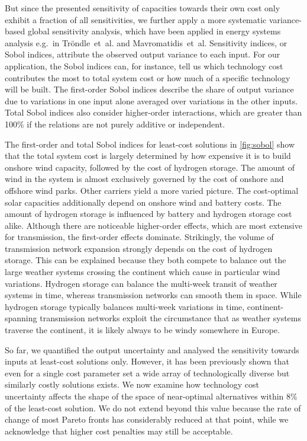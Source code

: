 But since the presented sensitivity of capacities towards their own cost only
exhibit a fraction of all sensitivities, we further apply a more systematic
variance-based global sensitivity analysis, which have been applied in energy
systems analysis e.g.~in Tröndle~et~al.\cite{trondle_trade-offs_2020} and
Mavromatidis~et~al.\cite{mavromatidis_uncertainty_2018} Sensitivity indices, or
Sobol indices, attribute the observed output variance to each input.
\cite{sudret_global_2008} For our application, the Sobol indices can, for
instance, tell us which technology cost contributes the most to total system
cost or how much of a specific technology will be built. The first-order Sobol
indices describe the share of output variance due to variations in one input
alone averaged over variations in the other inputs. Total Sobol indices also
consider higher-order interactions, which are greater than 100\% if the
relations are not purely additive or independent.

The first-order and total Sobol indices for least-cost solutions in
\cref{fig:sobol} show that the total system cost is largely determined by how
expensive it is to build onshore wind capacity, followed by the cost of hydrogen
storage. The amount of wind in the system is almost exclusively governed by the
cost of onshore and offshore wind parks. Other carriers yield a more varied
picture. The cost-optimal solar capacities additionally depend on onshore wind
and battery costs. The amount of hydrogen storage is influenced by battery and
hydrogen storage cost alike. Although there are noticeable higher-order effects,
which are most extensive for transmission, the first-order effects dominate.
Strikingly, the volume of transmission network expansion strongly depends on the
cost of hydrogen storage. This can be explained because they both compete to
balance out the large weather systems crossing the continent which cause in
particular wind variations. Hydrogen storage can balance the multi-week transit
of weather systems in time, whereas transmission networks can smooth them in space.
While hydrogen storage typically balances multi-week variations in time,
continent-spanning transmission networks exploit the circumstance that as
weather systems traverse the continent, it is likely always to be windy
somewhere in Europe.


So far, we quantified the output uncertainty and analysed the sensitivity
towards inputs at least-cost solutions only. However, it has been previously
shown that even for a single cost parameter set a wide array of technologically
diverse but similarly costly solutions
exists.\cite{nearoptimal,pedersen_modeling_2020,lombardi_policy_2020,pickeringDiversityOptions2022}
We now examine how technology cost uncertainty affects the shape of the space of
near-optimal alternatives within 8\% of the least-cost solution. We do not
extend beyond this value because the rate of change of most Pareto fronts has
considerably reduced at that point, while we acknowledge that higher cost
penalties may still be acceptable.

